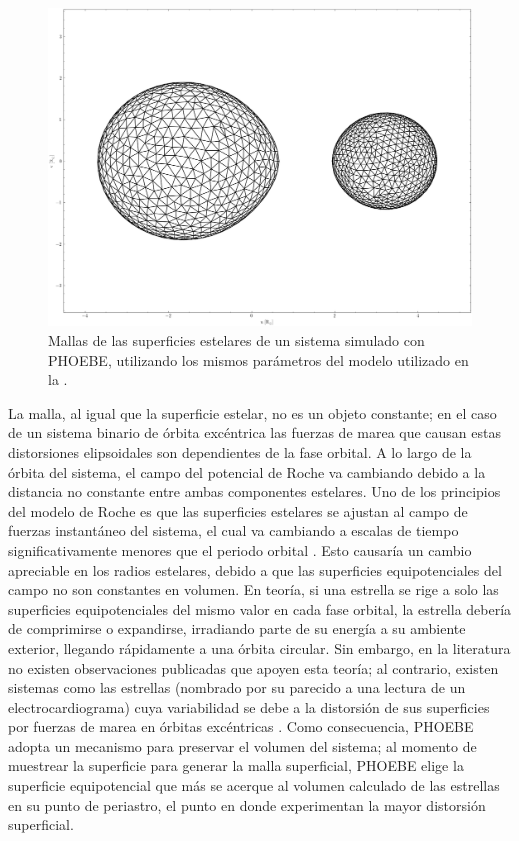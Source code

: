 \begin{figure}[!ht]
	\centering
	\includegraphics[scale=0.42]{Introduccion/Figures/Figura PHOEBE Malla.png}
	\caption{Mallas de las superficies estelares de un sistema simulado con
	PHOEBE, utilizando los mismos parámetros del modelo utilizado en la
	.}
	\label{figuraPhoebeMalla}
\end{figure}

La malla, al igual que la superficie estelar, no es un objeto constante; en el
caso de un sistema binario de órbita excéntrica las fuerzas de marea que causan
estas distorsiones elipsoidales son dependientes de la fase orbital. A lo largo
de la órbita del sistema, el campo del potencial de Roche va cambiando debido a
la distancia no constante entre ambas componentes estelares. Uno de los
principios del modelo de Roche es que las superficies estelares se ajustan al
campo de fuerzas instantáneo del sistema, el cual va cambiando a escalas de
tiempo significativamente menores que el periodo orbital
. Esto causaría un
cambio apreciable en los radios estelares, debido a que las superficies
equipotenciales del campo no son constantes en volumen. En teoría, si una
estrella se rige a solo las superficies equipotenciales del mismo valor en cada
fase orbital, la estrella debería de comprimirse o expandirse, irradiando parte
de su energía a su ambiente exterior, llegando rápidamente a una órbita
circular. Sin embargo, en la literatura no existen observaciones publicadas que
apoyen esta teoría; al contrario, existen sistemas como las estrellas
 (nombrado por su parecido a una lectura de un
electrocardiograma) cuya variabilidad se debe a la distorsión de sus superficies
por fuerzas de marea en órbitas excéntricas
.
Como consecuencia, PHOEBE adopta un mecanismo para preservar el volumen del
sistema; al momento de muestrear la superficie para generar la malla
superficial, PHOEBE elige la superficie equipotencial que más se acerque al
volumen calculado de las estrellas en su punto de periastro, el punto en donde
experimentan la mayor distorsión superficial.

